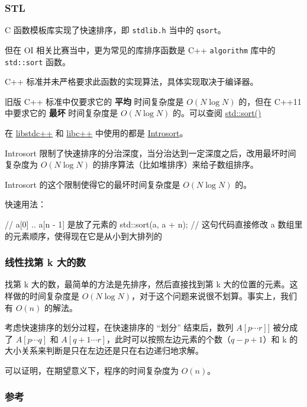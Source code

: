 \subsubsection{STL}

C 函数模板库实现了快速排序，即 \texttt{stdlib.h} 当中的 \texttt{qsort}。

但在 OI 相关比赛当中，更为常见的库排序函数是 C++ \texttt{algorithm} 库中的 \texttt{std::sort} 函数。

C++ 标准并未严格要求此函数的实现算法，具体实现取决于编译器。

旧版 C++ 标准中仅要求它的 \textbf{平均} 时间复杂度是 $O(N\log N)$ 的，但在 C++11 中要求它的 \textbf{最坏} 时间复杂度是 $O(N\log N)$ 的。可以查阅 \href{https://en.cppreference.com/w/cpp/algorithm/sort}{std::sort()}

在 \href{https://github.com/mirrors/gcc/blob/master/libstdc++-v3/include/bits/stl_algo.h}{libstdc++} 和 \href{http://llvm.org/svn/llvm-project/libcxx/trunk/include/algorithm}{libc++} 中使用的都是 \href{https://en.wikipedia.org/wiki/Introsort}{Introsort}。

Introsort 限制了快速排序的分治深度，当分治达到一定深度之后，改用最坏时间复杂度为 $O(N\log N)$ 的排序算法（比如堆排序）来给子数组排序。

Introsort 的这个限制使得它的最坏时间复杂度是 $O(N\log N)$ 的。

快速用法：

\begin{cppcode}
// a[0] .. a[n - 1] 是放了元素的
std::sort(a, a + n);
// 这句代码直接修改 a 数组里的元素顺序，使得现在它是从小到大排列的
\end{cppcode}

\subsubsection{线性找第 k 大的数}

找第 k 大的数，最简单的方法是先排序，然后直接找到第 k 大的位置的元素。这样做的时间复杂度是 $O(N\log N)$，对于这个问题来说很不划算。事实上，我们有 $O(n)$ 的解法。

考虑快速排序的划分过程，在快速排序的 “划分” 结束后，数列 $A[p \cdots r]]$ 被分成了 $A[p \cdots q]$ 和 $A[q+1 \cdots r]$，此时可以按照左边元素的个数（$q - p + 1$）和 k 的大小关系来判断是只在左边还是只在右边递归地求解。

可以证明，在期望意义下，程序的时间复杂度为 $O(n)$。

\subsubsection{参考}

